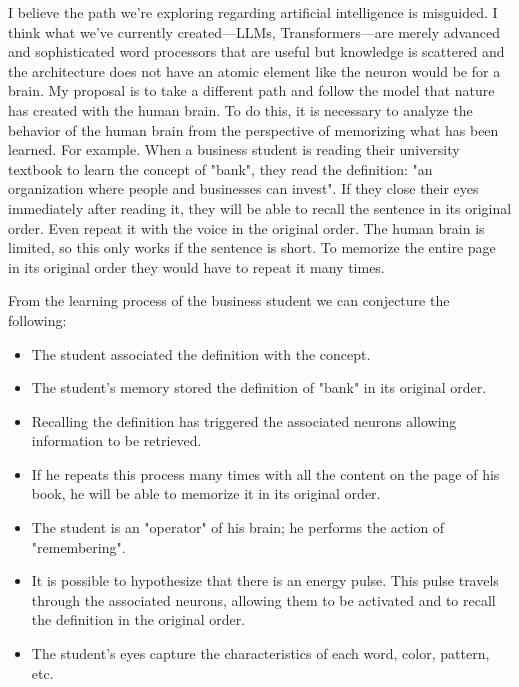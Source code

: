 \documentclass[12pt]{article}
\begin{document}
I believe the path we're exploring regarding artificial intelligence is misguided.
I think what we've currently created—LLMs, Transformers—are merely advanced and sophisticated word processors that are useful but knowledge is scattered and the architecture does not have an atomic element like the neuron would be for a brain.
My proposal is to take a different path and follow the model that nature has created with the human brain.
To do this, it is necessary to analyze the behavior of the human brain from the perspective of memorizing what has been learned.
For example. When a business student is reading their university textbook to learn the concept of "bank", they read the definition: "an organization where people and businesses can invest". 
If they close their eyes immediately after reading it, they will be able to recall the sentence in its original order.
Even repeat it with the voice in the original order.
The human brain is limited, so this only works if the sentence is short.
To memorize the entire page in its original order they would have to repeat it many times.

From the learning process of the business student we can conjecture the following:
\begin{itemize}
\item The student associated the definition with the concept.

\item The student's memory stored the definition of "bank" in its original order.

\item Recalling the definition has triggered the associated neurons allowing information to be retrieved.

\item If he repeats this process many times with all the content on the page of his book, he will be able to memorize it in its original order.

\item The student is an "operator" of his brain; he performs the action of "remembering".

\item It is possible to hypothesize that there is an energy pulse. This pulse travels through the associated neurons, allowing them to be activated and to recall the definition in the original order.

\item The student's eyes capture the characteristics of each word, color, pattern, etc.
\end{itemize}
\end{document}
